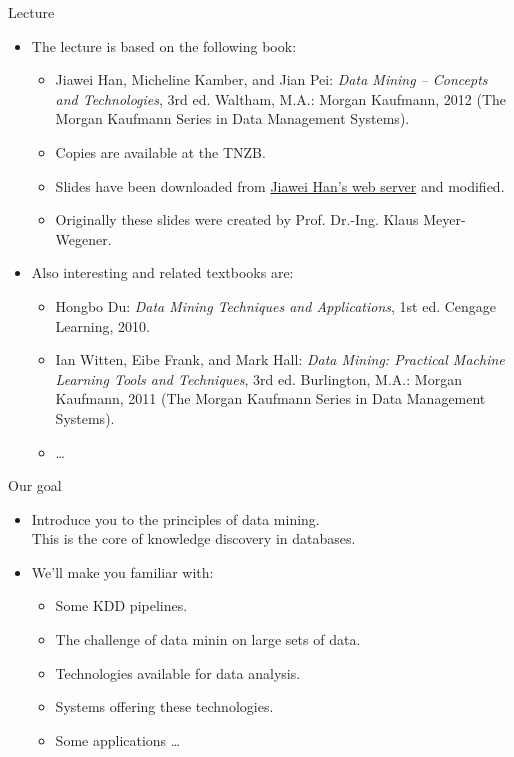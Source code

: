 \documentclass[aspectratio=169,t]{beamer}
\begin{document}
  { %
    \begin{frame}{Lecture}
      \begin{itemize}
          \item The lecture is based on the following book:
              \begin{itemize}
                  \item Jiawei Han, Micheline Kamber, and Jian Pei: \emph{Data Mining – Concepts and Technologies}, 3rd ed. Waltham, M.A.: Morgan Kaufmann, 2012 (The Morgan Kaufmann Series in Data Management Systems).
                  \item \small{Copies are available at the TNZB.}
                  \item \small{Slides have been downloaded from \href{http://hanj.cs.illinois.edu/}{Jiawei Han's web server} and modified.}
                  \item \small{Originally these slides were created by Prof. Dr.-Ing. Klaus Meyer-Wegener.}
              \end{itemize}
          \item Also interesting and related textbooks are:
              \begin{itemize}
                  \item Hongbo Du: \emph{Data Mining Techniques and Applications}, 1st ed. Cengage Learning, 2010.
                  \item Ian Witten, Eibe Frank, and Mark Hall: \emph{Data Mining: Practical Machine Learning Tools and Techniques}, 3rd ed. Burlington, M.A.: Morgan Kaufmann, 2011 (The Morgan Kaufmann Series in Data Management Systems).
                  \item \ldots
              \end{itemize}
      \end{itemize}
    \end{frame}
  }

  { %
    \begin{frame}{Our goal}
      \begin{itemize}
          \item Introduce you to the principles of data mining. \\ This is the core of knowledge discovery in databases.
          \item We'll make you familiar with:
              \begin{itemize}
                  \item Some KDD pipelines.
                  \item The challenge of data minin on large sets of data.
                  \item Technologies available for data analysis.
                  \item Systems offering these technologies.
                  \item Some applications \ldots
              \end{itemize}
      \end{itemize}
    \end{frame}
  }
\end{document}
